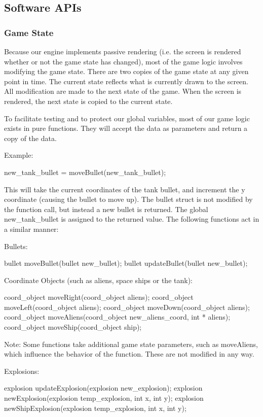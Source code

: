 \documentclass[11pt,letter,oneside]{report}
\begin{document}
\subsection{Software APIs}
\subsubsection{Game State}
Because our engine implements passive rendering (i.e. the screen is rendered whether or not the game state has changed), most of the game logic involves modifying the game state.  There are two copies of the game state at any given point in time.  The current state reflects what is currently drawn to the screen.  All modification are made to the next state of the game.  When the screen is rendered, the next state is copied to the current state.

To facilitate testing and to protect our global variables, most of our game logic exists in pure functions.  They will accept the data as parameters and return a copy of the data.

Example:

new\_tank\_bullet = moveBullet(new\_tank\_bullet);

This will take the current coordinates of the tank bullet, and increment the y coordinate (causing the bullet to move up).  The bullet struct is not modified by the function call, but instead a new bullet is returned.  The global new\_tank\_bullet is assigned to the returned value.  The following functions act in a similar manner:

Bullets:

bullet moveBullet(bullet new\_bullet);
bullet updateBullet(bullet new\_bullet);

Coordinate Objects (such as aliens, space ships or the tank):

coord\_object moveRight(coord\_object aliens);
coord\_object moveLeft(coord\_object aliens);
coord\_object moveDown(coord\_object aliens);
coord\_object moveAliens(coord\_object new\_aliens\_coord, int * aliens);
coord\_object moveShip(coord\_object ship);

Note:  Some functions take additional game state parameters, such as moveAliens, which influence the behavior of the function.  These are not modified in any way.

Explosions:

explosion updateExplosion(explosion new\_explosion);
explosion newExplosion(explosion temp\_explosion, int x, int y);
explosion newShipExplosion(explosion temp\_explosion, int x, int y);
\end{document}
